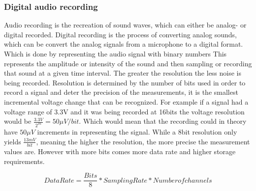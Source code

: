 \subsubsection{Digital audio recording}



Audio recording is the recreation of sound waves, which can either be analog- or digital recorded.
Digital recording is the process of converting analog sounds, which can be convert the analog signals from a microphone to a digital format. 
Which is done by representing the audio signal with binary numbers 
This represents the amplitude or intensity of the sound and then sampling or recording that sound at a given time interval.
The greater the resolution the less noise is being recorded.
Resolution is determined by the number of bits used in order to record a signal and deter the precision of the measurements, it is the smallest incremental voltage change that can be recognized.
For example if a signal had a voltage range of 3.3V and it was being recorded at 16bits the voltage resolution would be $\frac{3.3V}{2^{16}} = 50\mu V/bit$.
Which would mean that the recording could in theory have $50\mu V$ increments in representing the signal.  
While a 8bit resolution only yields $\frac{13mV}{bit}$, meaning the higher the resolution, the more precise the measurement values are.
However with more bits comes more data rate and higher storage requirements.

\begin{equation}
    Data Rate = \frac{Bits}{8} * Sampling Rate * Number of channels 
    \label{eq:dataRate}
\end{equation}

